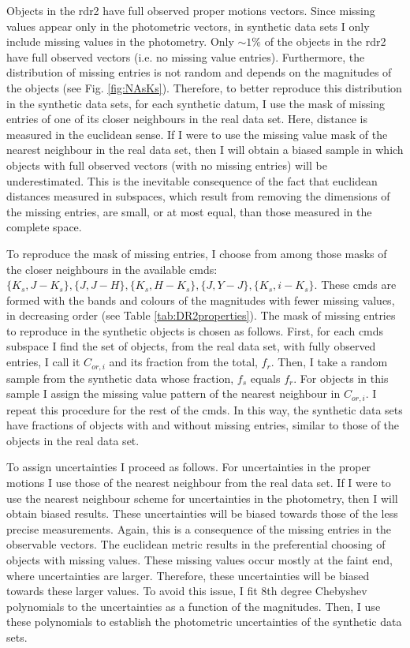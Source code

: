 Objects in the \gls{rdr2}  have full observed proper motions vectors. Since missing values appear only in the photometric vectors, in synthetic data sets I only include missing values in the photometry. Only $\sim1\%$ of the objects in the \gls{rdr2} have full observed vectors (i.e. no missing value entries). Furthermore, the distribution of missing entries is not random and depends on the magnitudes of the objects (see Fig. \ref{fig:NAsKs}). Therefore, to better reproduce this distribution in the synthetic data sets, for each synthetic datum, I use the mask of missing entries of one of its closer neighbours in the real data set. Here, distance is measured in the euclidean sense. If I were to use the missing value mask of the nearest neighbour in the real data set, then I will obtain a biased sample in which objects with full observed vectors (with no missing entries) will be underestimated. This is the inevitable consequence of the fact that euclidean distances measured in subspaces, which result from removing the dimensions of the missing entries, are small, or at most equal, than those measured in the complete space. 

To reproduce the mask of missing entries, I choose from among those masks of the closer neighbours in the available \glspl{cmd}: $\{K_s,J-K_s\},\{J,J-H\},\{K_s,H-K_s\},\{J,Y-J\},\{K_s,i-K_s\}$. These \glspl{cmd} are formed with the bands and colours of the magnitudes with fewer missing values, in decreasing order (see Table \ref{tab:DR2properties}).  The mask of missing entries to reproduce in the synthetic objects is chosen as follows. First, for each \glspl{cmd} subspace I find the set of objects, from the real data set, with fully observed entries, I call it $C_{or,i}$ and its fraction from the total, $f_r$. Then, I take a random sample from the synthetic data whose fraction, $f_s$ equals $f_r$. For objects in this sample I assign the missing value pattern of the nearest neighbour in $C_{or,i}$. I repeat this procedure for the rest of the \glspl{cmd}. In this way, the synthetic data sets have fractions of objects with and without missing entries, similar to those of the objects in the real data set.

To assign uncertainties I proceed as follows. For uncertainties in the proper motions I use those of the nearest neighbour from the real data set. If I were to use the nearest neighbour scheme for uncertainties in the photometry, then I will obtain biased results. These uncertainties will be biased towards those of the less precise measurements. Again, this is a consequence of the missing entries in the observable vectors. The euclidean metric results in the preferential choosing of objects with missing values. These missing values occur mostly at the faint end, where uncertainties are larger. Therefore, these uncertainties will be biased towards these larger values. To avoid this issue, I fit 8th degree Chebyshev polynomials to the uncertainties as a function of the magnitudes. Then, I use these polynomials to establish the photometric uncertainties of the synthetic data sets.

